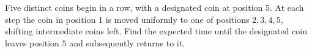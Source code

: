 Five distinct coins begin in a row, with a designated coin at position $5$. At each step the coin in position $1$ is moved uniformly to one of positions $2,3,4,5$, shifting intermediate coins left. Find the expected time until the designated coin leaves position $5$ and subsequently returns to it.
